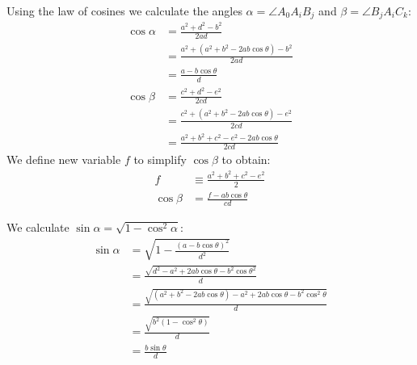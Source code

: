 \documentclass[11pt]{article}
\begin{document}
Using the law of cosines we calculate the angles $\alpha =\angle{A_0A_iB_j}$ 
and $\beta =\angle{B_jA_iC_k}$:
\begin{align}
\cos\alpha &= \frac{a^2 + d^2 - b^2}{2ad} \\
 &= \frac{a^2 + (a^2 + b^2 - 2ab\cos\theta) - b^2}{2ad}\nonumber \\
 &= \frac{a - b\cos\theta}{d}\\
%
\cos\beta &= \frac{c^2 + d^2 - e^2}{2cd}\nonumber\\
 &= \frac{c^2 + (a^2 + b^2 - 2ab\cos\theta) - e^2}{2cd}\nonumber\\
 &= \frac{a^2 + b^2 + c^2 - e^2 - 2ab\cos\theta}{2cd}
\end{align}
We define new variable $f$ to simplify $\cos\beta$ to obtain:
\begin{align}
f &\equiv \frac{a^2 + b^2 + c^2 - e^2}{2} \\
\cos\beta &= \frac{f - ab\cos\theta}{cd}
\end{align}

We calculate $\sin\alpha = \sqrt{1 - \cos^2\alpha}$:
\begin{align}
\sin\alpha &= \sqrt{1 - \frac{(a - b\cos\theta)^2}{d^2}}\nonumber\\
 &=\frac{\sqrt{d^2 - a^2 + 2ab\cos\theta - b^2\cos\theta^2}}{d}\nonumber\\
 &=\frac{\sqrt{(a^2 + b^2 - 2ab\cos\theta) - a^2 + 2ab\cos\theta - b^2\cos^2\theta}}{d}\nonumber\\
 &=\frac{\sqrt{b^2(1-\cos^2\theta)}}{d}\nonumber\\
 &=\frac{b\sin\theta}{d}\\
\end{align}



\end{document}
